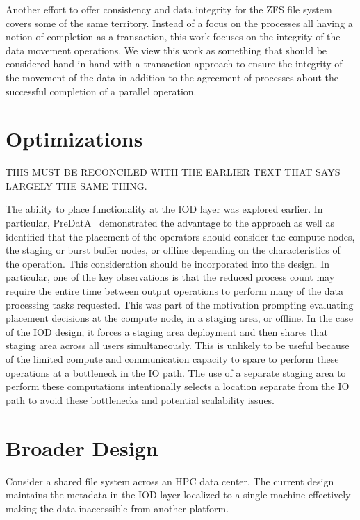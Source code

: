 \documentclass[conference]{sig-alt-gov2}
\begin{document}
Another effort to offer consistency and data integrity for the ZFS file
system~\cite{zhang:2010:zfs} covers some of the same territory. Instead of a
focus on the processes all having a notion of completion as a transaction, this
work focuses on the integrity of the data movement operations. We view this
work as something that should be considered hand-in-hand with a transaction
approach to ensure the integrity of the movement of the data in addition to the
agreement of processes about the successful completion of a parallel operation.

\section{Optimizations}
\label{sec:optimizations}

THIS MUST BE RECONCILED WITH THE EARLIER TEXT THAT SAYS LARGELY THE SAME THING.

The ability to place functionality at the IOD layer was explored earlier. In
particular, PreDatA~\cite{zheng:2010:predata} demonstrated the advantage to
the approach as well as identified that the placement of the operators should
consider the compute nodes, the staging or burst buffer nodes, or offline
depending on the characteristics of the operation. This consideration should
be incorporated into the design. In particular, one of the key observations
is that the reduced process count may require the entire time between output
operations to perform many of the data processing tasks requested. This was
part of the motivation prompting evaluating placement decisions at the compute
node, in a staging area, or offline. In the case of the IOD design, it forces
a staging area deployment and then shares that staging area across all users
simultaneously. This is unlikely to be useful because of the limited compute
and communication capacity to spare to perform these operations at a bottleneck
in the IO path. The use of a separate staging area to perform these computations
intentionally selects a location separate from the IO path to avoid these
bottlenecks and potential scalability issues.

\section{Broader Design}
\label{sec:summary}

Consider a shared file system across an HPC data center. The current design
maintains the metadata in the IOD layer localized to a single machine
effectively making the data inaccessible from another platform.
\end{document}
